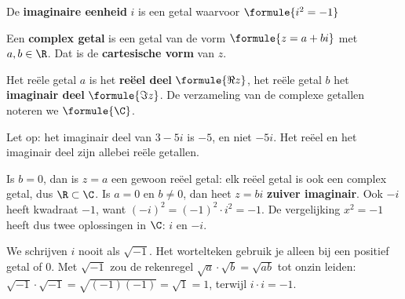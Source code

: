 \begin{theorie}
De \textbf{\textcolor{accent}{imaginaire eenheid}} $i$ is een getal waarvoor \quad $\formule{i^2 = -1}$

\vspace{1mm}
Een \textbf{\textcolor{accent}{complex getal}} is een getal van de vorm \quad $\formule{z = a + bi}$ \quad met $a, b \in \R$. Dat is de \textbf{\textcolor{accent}{cartesische vorm}} van $z$.

\vspace{1mm}
Het reële getal $a$ is het \textbf{\textcolor{accent}{reëel deel}} $\formule{\Re z}$, het reële getal $b$ het \textbf{\textcolor{accent}{imaginair deel}} $\formule{\Im z}$.
De verzameling van de complexe getallen noteren we $\formule{\C}$.
\end{theorie}

Let op: het imaginair deel van $3 - 5i$ is $-5$, en niet $-5i$. Het reëel en het imaginair deel zijn allebei reële getallen.

Is $b = 0$, dan is $z = a$ een gewoon reëel getal: elk reëel getal is ook een complex getal, dus $\R \subset \C$. Is $a = 0$ en $b \neq 0$, dan heet $z = bi$ \textbf{zuiver imaginair}. Ook $-i$ heeft kwadraat $-1$, want $(-i)^2 = (-1)^2 \cdot i^2 = -1$. De vergelijking $x^2 = -1$ heeft dus twee oplossingen in $\C$: $i$ en $-i$.

We schrijven $i$ nooit als $\sqrt{-1}$. Het wortelteken gebruik je alleen bij een positief getal of 0. Met $\sqrt{-1}$ zou de rekenregel $\sqrt{a} \cdot \sqrt{b} = \sqrt{ab}$ tot onzin leiden: $\sqrt{-1} \cdot \sqrt{-1} = \sqrt{(-1)(-1)} = \sqrt{1} = 1$, terwijl $i \cdot i = -1$.


